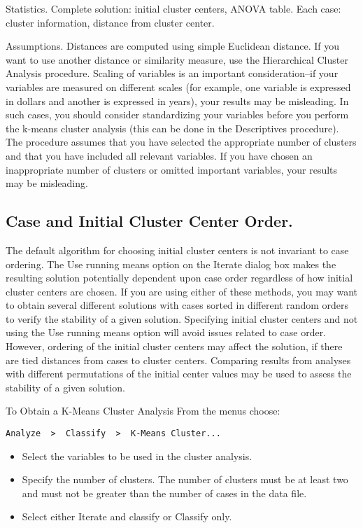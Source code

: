 \documentclass[a4paper,12pt]{article}
\begin{document}
Statistics. Complete solution: initial cluster centers, ANOVA table.  Each case: cluster information, distance from cluster center.

Assumptions. Distances are computed using simple Euclidean distance. If you want to use another distance or similarity measure, use the Hierarchical Cluster Analysis procedure. Scaling of variables is an important consideration--if your variables are measured on different scales (for example, one variable is expressed in dollars and another is expressed in years), your results may be misleading. In such cases, you should consider standardizing your variables before you perform the k-means cluster analysis (this can be done in the Descriptives procedure). The procedure assumes that you have selected the appropriate number of clusters and that you have included all relevant variables. If you have chosen an inappropriate number of clusters or omitted important variables, your results may be misleading.

\subsection*{Case and Initial Cluster Center Order.} The default algorithm for choosing initial cluster centers is not invariant to case ordering. The Use running means option on the Iterate dialog box makes the resulting solution potentially dependent upon case order regardless of how initial cluster centers are chosen. If you are using either of these methods, you may want to obtain several different solutions with cases sorted in different random orders to verify the stability of a given solution. Specifying initial cluster centers and not using the Use running means option will avoid issues related to case order. However, ordering of the initial cluster centers may affect the solution, if there are tied distances from cases to cluster centers. Comparing results from analyses with different permutations of the initial center values may be used to assess the stability of a given solution.

To Obtain a K-Means Cluster Analysis
From the menus choose:
\begin{verbatim}
Analyze  >  Classify  >  K-Means Cluster...    
\end{verbatim}

\begin{itemize}
\item 	Select the variables to be used in the cluster analysis. 
\item 	Specify the number of clusters. The number of clusters must be at least two and must not be greater than the number of cases in the data file.
\item 	Select either Iterate and classify or Classify only.
\end{itemize}
\end{document}
